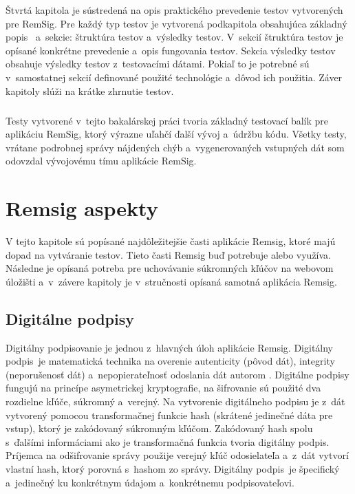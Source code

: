 \documentclass[
  digital, %
  table,   %
oneside,
  nolof,     %
  nolot,     %
]{fithesis3}
\begin{document}
Štvrtá kapitola je sústredená na opis praktického prevedenie testov vytvorených pre RemSig. Pre každý typ testov je vytvorená podkapitola obsahujúca základný popis~ a~sekcie: štruktúra testov a~výsledky testov. V~sekcií štruktúra testov je opísané konkrétne prevedenie a~opis fungovania testov. Sekcia výsledky testov obsahuje výsledky testov z~testovacími dátami. Pokiaľ to je potrebné sú v~samostatnej sekcií definované použité technológie a~dôvod ich použitia. Záver kapitoly slúži na krátke zhrnutie testov.\paragraph{}
Testy vytvorené v~tejto bakalárskej práci tvoria základný testovací balík pre aplikáciu RemSig, ktorý výrazne uľahčí ďalší vývoj a~údržbu kódu. Všetky testy, vrátane podrobnej správy nájdených chýb a~vygenerovaných vstupných dát som odovzdal vývojovému tímu aplikácie RemSig.
\chapter{Remsig aspekty}
V tejto kapitole sú popísané najdôležitejšie časti aplikácie Remsig, ktoré majú dopad na vytváranie testov. Tieto časti Remsig buď potrebuje alebo využíva. Následne je opísaná potreba pre uchovávanie súkromných kľúčov na webovom úložišti a~v~závere kapitoly je v~stručnosti opísaná samotná aplikácia Remsig.
\section{Digitálne podpisy}
Digitálny podpisovanie je jednou z~hlavných úloh aplikácie Remsig. Digitálny podpis~je matematická technika na overenie autenticity (pôvod dát), integrity (neporušenosť dát) a~nepopierateľnosť odoslania dát autorom \cite{digitalSignature}.  Digitálne podpisy fungujú na princípe asymetrickej kryptografie, na šifrovanie sú použité dva rozdielne kľúče, súkromný a~verejný. Na vytvorenie digitálneho podpisu je z~dát vytvorený pomocou transformačnej funkcie  hash (skrátené jedinečné dáta pre vstup), ktorý je zakódovaný súkromným kľúčom. Zakódovaný hash spolu s~ďalšími informáciami ako je transformačná funkcia tvoria digitálny podpis. Príjemca na odšifrovanie správy použije verejný kľúč odosielateľa a~z~dát vytvorí vlastní hash, ktorý porovná s~hashom zo správy. Digitálny podpis~je špecifický a~jedinečný ku konkrétnym údajom a~konkrétnemu podpisovateľovi.
\end{document}
